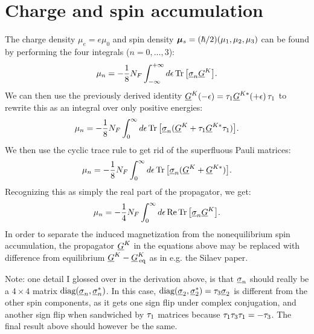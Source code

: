 \clearpage
\section{Charge and spin accumulation}
The charge density $\mu_e = e\mu_0$ and spin density $\B{\mu}_s = (\hbar/2)(\mu_1, \mu_2, \mu_3)$ can be found by performing the four integrals ($n=0,\ldots,3$):
\begin{equation}
  \mu_n = -\frac{1}{8}N_F  \int_{-\infty}^{+\infty} \d\epsilon \tr\big[ \S{n} \U{G}^K \big].
\end{equation}
We can then use the previously derived identity $\U{G}^K(-\epsilon) = \N{1} \U{G}^{K*}(+\epsilon) \,\N{1}$ to rewrite this as an integral over only positive energies:
\begin{equation}
  \mu_n = -\frac{1}{8}N_F  \int_{0}^{\infty} \d\epsilon \tr\big[ \S{n} (\U{G}^K + \N{1} \U{G}^{K*} \N{1})\big].
\end{equation}
We then use the cyclic trace rule to get rid of the superfluous Pauli matrices:
\begin{equation}
  \mu_n = -\frac{1}{8}N_F  \int_{0}^{\infty} \d\epsilon \tr\big[ \S{n} (\U{G}^K + \U{G}^{K*})\big].
\end{equation}
Recognizing this as simply the real part of the propagator, we get:
\begin{equation}
  \mu_n = -\frac{1}{4}N_F  \int_{0}^{\infty} \d\epsilon \re\tr\big[ \S{n} \U{G}^K \big].
\end{equation}
In order to separate the induced magnetization from the nonequilibrium spin accumulation, the propagator $\U{G}^K$ in the equations above may be replaced with difference from equilibrium $\U{G}^K-\U{G}^K_\text{\,eq}$ as in e.g. the Silaev paper.

Note: one detail I glossed over in the derivation above, is that $\S{n}$ should really be a $4\times4$ matrix $\text{diag}(\S{n},\S{n}^*)$.
In this case, $\text{diag}(\S{2}, \S{2}^*) = \N{3}\S{2}$ is different from the other spin components, as it gets one sign flip under complex conjugation, and another sign flip when sandwiched by $\N{1}$ matrices because $\N{1}\N{3}\N{1}=-\N{3}$.
The final result above should however be the same.

\clearpage
